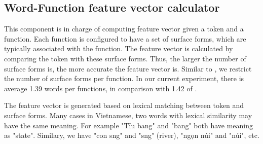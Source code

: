 \subsection{Word-Function feature vector calculator}
\label{sec:model.word-function}
This component is in charge of computing feature vector given a token and a function. Each function is configured to have a set of surface forms, which are typically associated with the function. The feature vector is calculated by comparing the token with these surface forms. Thus, the larger the number of surface forms is, the more accurate the feature vector is. Similar to \cite{Clarke:2010:DSP:1870568.1870571}, we restrict the number of surface forms per function. In our current experiment, there is average 1.39 words per functions, in comparison with 1.42 of \cite{Clarke:2010:DSP:1870568.1870571}.

The feature vector is generated based on lexical matching between token and surface forms. Many cases in Vietnamese, two words with lexical similarity may have the same meaning. For example "{\selectfont Ti\h\ecircumflex u bang" and "bang" both have meaning as "state". Similary, we have "con s\ocircumflex ng" and "s\ocircumflex ng" (river), "ng\d{o}n n\'ui" and "n\'ui", etc.} 